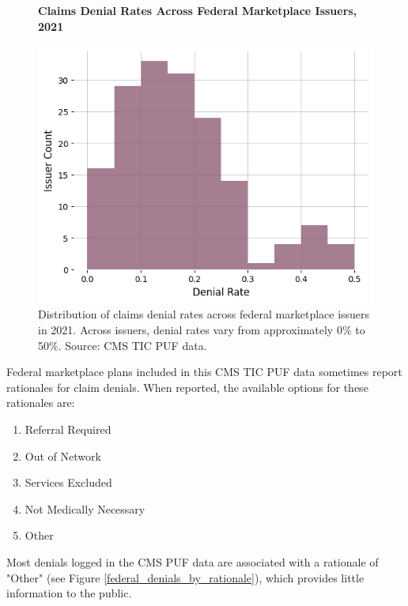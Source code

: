\documentclass[psamsfonts]{amsart}
\theoremstyle{plain}
\theoremstyle{definition}
\theoremstyle{remark}
\begin{document}
\begin{figure}
	\centering
	\textbf{Claims Denial Rates Across Federal Marketplace Issuers, 2021}\par\medskip
	\includegraphics[width=0.85\columnwidth]{images/cms_puf/denial_rates_all_insurers.png}
	\caption{Distribution of claims denial rates across federal marketplace issuers in 2021. Across issuers, denial rates vary from approximately 0\% to 50\%. Source: CMS TIC PUF data.}
	\label{federal_denial_rate_hist}
\end{figure}

Federal marketplace plans included in this CMS TIC PUF data sometimes report rationales for claim denials. When reported, the available options for these rationales are:\\

\begin{enumerate}
	\item Referral Required
	\item Out of Network
	\item Services Excluded
	\item Not Medically Necessary
	\item Other
\end{enumerate}

Most denials logged in the CMS PUF data are associated with a rationale of "Other" (see Figure \ref{federal_denials_by_rationale}), which provides little information to the public.\\
\end{document}
